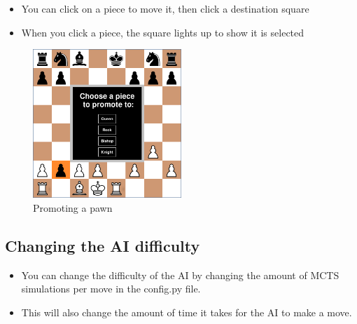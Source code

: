 \documentclass{article}
\begin{document}
\begin{itemize}
    \item You can click on a piece to move it, then click a destination square
    \item When you click a piece, the square lights up to show it is selected 
\end{itemize}

\begin{figure}[H]
    \centering
    \includegraphics[width=0.5\textwidth]{img/chessboard-promotion.png}
    \caption{Promoting a pawn}
\end{figure}

\subsection{Changing the AI difficulty}

\begin{itemize}
    \item You can change the difficulty of the AI by changing the amount of MCTS simulations per move in the config.py file.
    \item This will also change the amount of time it takes for the AI to make a move.
\end{itemize}
\end{document}
